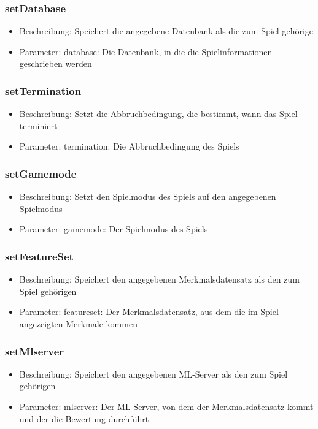 \documentclass[a4paper]{scrreprt}
\begin{document}
	\subsubsection{setDatabase}
		\begin{itemize}
		\item Beschreibung: Speichert die angegebene Datenbank als die zum Spiel gehörige
		\item Parameter: database: Die Datenbank, in die die Spielinformationen geschrieben werden
		\end{itemize}
	\subsubsection{setTermination}
		\begin{itemize}
		\item Beschreibung: Setzt die Abbruchbedingung, die bestimmt, wann das Spiel terminiert
		\item Parameter: termination: Die Abbruchbedingung des Spiels
		\end{itemize}
	\subsubsection{setGamemode}
		\begin{itemize}
		\item Beschreibung: Setzt den Spielmodus des Spiels auf den angegebenen Spielmodus
		\item Parameter: gamemode: Der Spielmodus des Spiels
		\end{itemize}
	\subsubsection{setFeatureSet}
		\begin{itemize}
		\item Beschreibung: Speichert den angegebenen Merkmalsdatensatz als den zum Spiel gehörigen
		\item Parameter: featureset: Der Merkmalsdatensatz, aus dem die im Spiel angezeigten Merkmale kommen
		\end{itemize}
	\subsubsection{setMlserver}
		\begin{itemize}
		\item Beschreibung: Speichert den angegebenen ML-Server als den zum Spiel gehörigen
		\item Parameter: mlserver: Der ML-Server, von dem der Merkmalsdatensatz kommt und der die Bewertung durchführt
		\end{itemize}
\end{document}
